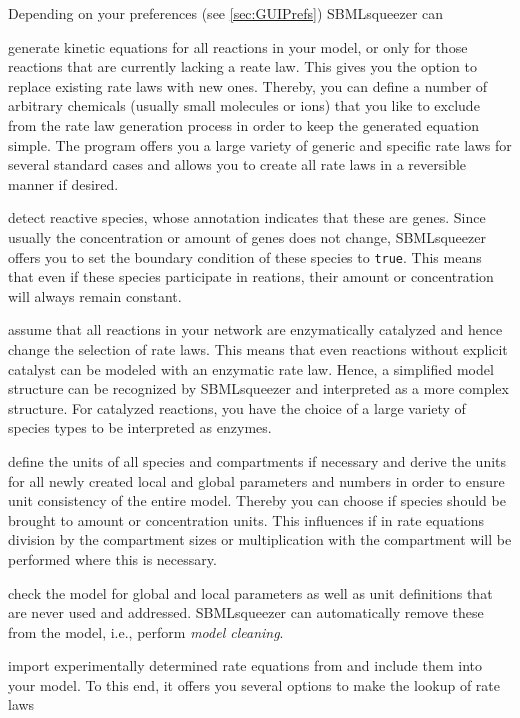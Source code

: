 Depending on your preferences (see \vref{sec:GUIPrefs}) SBMLsqueezer can
\begin{dinglist}{52}
\item generate kinetic equations for all reactions in your model, or only for those
  reactions that are currently lacking a reate law.
  This gives you the option to replace existing rate laws with new ones.
  Thereby, you can define a number of arbitrary chemicals (usually small molecules or
  ions) that you like to exclude from the rate law generation process in order to keep
  the generated equation simple.
  The program offers you a large variety of generic and specific rate laws for several
  standard cases and allows you to create all rate laws in a reversible manner if desired.
\item detect reactive species, whose annotation indicates that these are genes.
  Since usually the concentration or amount of genes does not change, SBMLsqueezer
  offers you to set the boundary condition of these species to \texttt{true}.
  This means that even if these species participate in reations, their amount or
  concentration will always remain constant.
\item assume that all reactions in your network are enzymatically catalyzed and hence
  change the selection of rate laws. This means that even reactions without explicit
  catalyst can be modeled with an enzymatic rate law. Hence, a simplified model structure
  can be recognized by SBMLsqueezer and interpreted as a more complex structure.
  For catalyzed reactions, you have the choice of a large variety of species types to
  be interpreted as enzymes.
\item define the units of all species and compartments if necessary and derive the
  units for all newly created local and global parameters and numbers in order to ensure unit
  consistency of the entire model. Thereby you can choose if species should be brought
  to amount or concentration units. This influences if in rate equations division by
  the compartment sizes or multiplication with the compartment will be performed where
  this is necessary.
\item check the model for global and local parameters as well as unit definitions
  that are never used and addressed. SBMLsqueezer can automatically remove these from
  the model, i.e., perform \emph{model cleaning}.
\item import experimentally determined rate equations from \SABIO and include them into
  your model. To this end, it offers you several options to make the lookup of rate laws

\end{dinglist}
